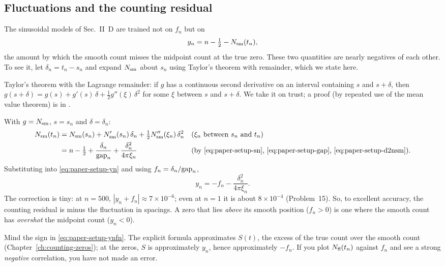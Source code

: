 \subsection{Fluctuations and the counting residual}

The sinusoidal models of Sec.~II~D are trained not on $f_n$ but on
\begin{equation}
y_n=n-\tfrac12-N_{\mathrm{sm}}(t_n),
\label{eq:paper-setup-yn}
\end{equation}
the amount by which the smooth count misses the midpoint count at the true zero. These two quantities are nearly negatives of each other. To see it, let $\delta_n=t_n-s_n$ and expand $N_{\mathrm{sm}}$ about $s_n$ using Taylor's theorem with remainder, which we state here.
\begin{beyond}
Taylor's theorem with the Lagrange remainder: if $g$ has a continuous second derivative on an interval containing $s$ and $s+\delta$, then $g(s+\delta)=g(s)+g'(s)\,\delta+\tfrac12 g''(\xi)\,\delta^2$ for some $\xi$ between $s$ and $s+\delta$. We take it on trust; a proof (by repeated use of the mean value theorem) is in \cite{rhb}.
\end{beyond}
With $g=N_{\mathrm{sm}}$, $s=s_n$ and $\delta=\delta_n$:
\begin{align}
N_{\mathrm{sm}}(t_n)&=N_{\mathrm{sm}}(s_n)+N_{\mathrm{sm}}'(s_n)\,\delta_n+\tfrac12N_{\mathrm{sm}}''(\xi_n)\,\delta_n^2
&&\text{($\xi_n$ between $s_n$ and $t_n$)}\nonumber\\
&=n-\tfrac12+\frac{\delta_n}{\mathrm{gap}_n}+\frac{\delta_n^2}{4\pi\xi_n}
&&\text{(by \eqref{eq:paper-setup-sn}, \eqref{eq:paper-setup-gap}, \eqref{eq:paper-setup-d2nsm})}.\nonumber
\end{align}
Substituting into \eqref{eq:paper-setup-yn} and using $f_n=\delta_n/\mathrm{gap}_n$,
\begin{equation}
y_n=-f_n-\frac{\delta_n^2}{4\pi\xi_n}.
\label{eq:paper-setup-ynfn}
\end{equation}
The correction is tiny: at $n=500$, $|y_n+f_n|\approx7\times10^{-6}$; even at $n=1$ it is about $8\times10^{-4}$ (Problem~15). So, to excellent accuracy, the counting residual is minus the fluctuation in spacings. A zero that lies \emph{above} its smooth position ($f_n>0$) is one where the smooth count has \emph{overshot} the midpoint count ($y_n<0$).

\begin{pitfall}
Mind the sign in \eqref{eq:paper-setup-ynfn}. The explicit formula approximates $S(t)$, the excess of the true count over the smooth count (Chapter~\ref{ch:counting-zeros}); at the zeros, $S$ is approximately $y_n$, hence approximately $-f_n$. If you plot $N_{\mathrm{fl}}(t_n)$ against $f_n$ and see a strong \emph{negative} correlation, you have not made an error.
\end{pitfall}

